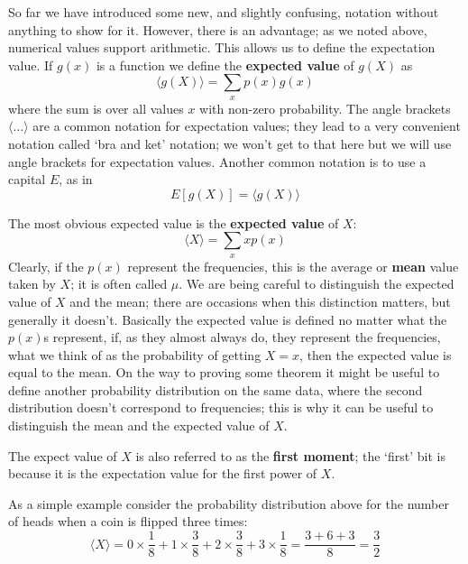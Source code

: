 \documentclass[11pt,a4paper]{scrartcl}
\begin{document}
So far we have introduced some new, and slightly confusing, notation
without anything to show for it. However, there is an advantage; as we
noted above, numerical values support arithmetic. This allows us to
define the expectation value. If $g(x)$ is a function we define the
\textbf{expected value} of $g(X)$ as
\begin{equation}
\langle g(X)\rangle = \sum_x p(x)g(x)
\end{equation}
where the sum is over all values $x$ with non-zero probability. The
angle brackets $\langle \ldots \rangle$ are a common notation for
expectation values; they lead to a very convenient notation called
\lq{}bra and ket\rq{} notation; we won't get to that here but we will
use angle brackets for expectation values. Another common notation is
to use a capital $E$, as in
\begin{equation}
E[g(X)]=\langle g(X)\rangle
\end{equation}

The most obvious expected value is the \textbf{expected value} of $X$:
\begin{equation}
\langle X \rangle =  \sum_x x p(x)
\end{equation}
Clearly, if the $p(x)$ represent the frequencies, this is the average
or \textbf{mean} value taken by $X$; it is often called $\mu$. We are
being careful to distinguish the expected value of $X$ and the mean;
there are occasions when this distinction matters, but generally it
doesn't. Basically the expected value is defined no matter what the
$p(x)$s represent, if, as they almost always do, they represent the
frequencies, what we think of as the probability of getting $X=x$,
then the expected value is equal to the mean. On the way to proving
some theorem it might be useful to define another probability
distribution on the same data, where the second distribution doesn't
correspond to frequencies; this is why it can be useful to distinguish
the mean and the expected value of $X$.

The expect value of $X$ is also referred to as the \textbf{first
  moment}; the \lq{}first\rq{} bit is because it is the expectation
value for the first power of $X$.

As a simple example consider the probability distribution above for
the number of heads when a coin is flipped three times:
\begin{equation}
\langle X\rangle =0\times\frac{1}{8}+1\times\frac{3}{8}+2\times\frac{3}{8}+3\times \frac{1}{8}=\frac{3+6+3}{8}=\frac{3}{2}
\end{equation}
\end{document}

